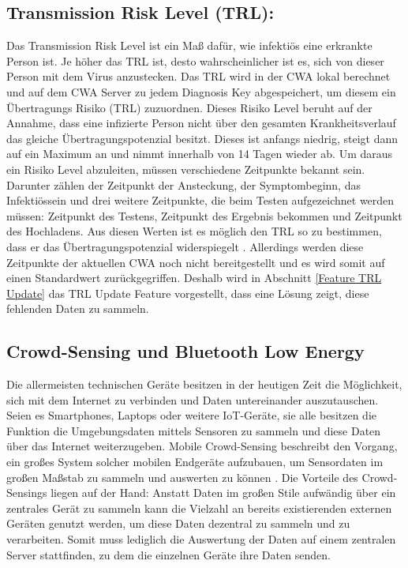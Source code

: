 \documentclass[conference,compsoc]{IEEEtran}
\begin{document}
\subsection{Transmission Risk Level (TRL):} \label{TRL}
Das Transmission Risk Level ist ein Maß dafür, wie infektiös eine erkrankte Person ist. Je höher das TRL ist, desto wahrscheinlicher ist es, sich von dieser Person mit dem Virus anzustecken.
Das TRL wird in der CWA lokal berechnet und auf dem CWA Server zu jedem Diagnosis Key abgespeichert, um diesem ein Übertragungs Risiko (TRL) zuzuordnen. 
Dieses Risiko Level beruht auf der Annahme, dass eine infizierte Person nicht über den gesamten Krankheitsverlauf das gleiche Übertragungspotenzial besitzt. 
Dieses ist anfangs niedrig, steigt dann auf ein Maximum an und nimmt innerhalb von 14 Tagen wieder ab. Um daraus ein Risiko Level abzuleiten, müssen verschiedene Zeitpunkte bekannt sein. 
Darunter zählen der Zeitpunkt der Ansteckung, der Symptombeginn, das Infektiössein und drei weitere Zeitpunkte, die beim Testen aufgezeichnet werden müssen: 
Zeitpunkt des Testens, Zeitpunkt des Ergebnis bekommen und Zeitpunkt des Hochladens. Aus diesen Werten ist es möglich den TRL so zu bestimmen, 
dass er das Übertragungspotenzial widerspiegelt \cite{CWADokuTRL}.
Allerdings werden diese Zeitpunkte der aktuellen CWA noch nicht bereitgestellt und es wird somit auf einen Standardwert zurückgegriffen.
Deshalb wird in Abschnitt \ref{Feature TRL Update} das TRL Update  Feature vorgestellt, dass eine Lösung zeigt, diese fehlenden Daten zu sammeln.

\subsection{Crowd-Sensing und Bluetooth Low Energy}
Die allermeisten technischen Geräte besitzen in der heutigen Zeit die Möglichkeit, sich mit dem Internet zu verbinden und Daten untereinander auszutauschen.
Seien es Smartphones, Laptops oder weitere IoT-Geräte, sie alle besitzen die Funktion die Umgebungsdaten mittels Sensoren zu sammeln und diese Daten über das Internet weiterzugeben.
Mobile Crowd-Sensing beschreibt den Vorgang, ein großes System solcher mobilen Endgeräte aufzubauen, um Sensordaten im großen Maßstab zu sammeln und auswerten zu können \cite{MCS}.
Die Vorteile des Crowd-Sensings liegen auf der Hand: Anstatt Daten im großen Stile aufwändig über ein zentrales Gerät zu sammeln kann die Vielzahl an bereits existierenden externen Geräten genutzt werden, um diese Daten dezentral zu sammeln und zu verarbeiten.
Somit muss lediglich die Auswertung der Daten auf einem zentralen Server stattfinden, zu dem die einzelnen Geräte ihre Daten senden. 
\end{document}
